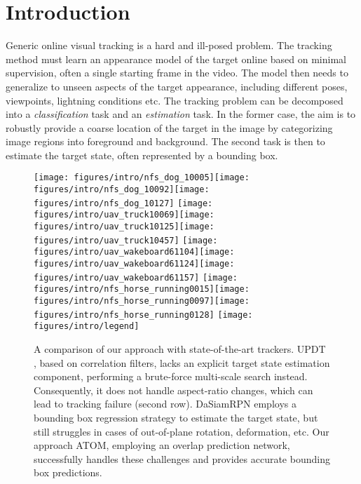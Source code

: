 \documentclass[10pt,twocolumn,letterpaper]{article}
\begin{document}
\section{Introduction}

Generic online visual tracking is a hard and ill-posed problem. The tracking method must learn an appearance model of the target  online based on minimal supervision, often a single starting frame in the video. The model then needs to generalize to unseen aspects of the target appearance, including different poses, viewpoints, lightning conditions etc. The tracking problem can be decomposed into a \emph{classification} task and an \emph{estimation} task. In the former case, the aim is to robustly provide a coarse location of the target in the image by categorizing image regions into foreground and background. The second task is then to estimate the target state, often represented by a bounding box.



\begin{figure}[!t]
	\centering \newcommand{\wid}{0.33\columnwidth}\texttt{[image: figures/intro/nfs\_dog\_10005]}\texttt{[image: figures/intro/nfs\_dog\_10092]}\texttt{[image: figures/intro/nfs\_dog\_10127]}
	\texttt{[image: figures/intro/uav\_truck10069]}\texttt{[image: figures/intro/uav\_truck10125]}\texttt{[image: figures/intro/uav\_truck10457]}
	\texttt{[image: figures/intro/uav\_wakeboard61104]}\texttt{[image: figures/intro/uav\_wakeboard61124]}\texttt{[image: figures/intro/uav\_wakeboard61157]}
	\texttt{[image: figures/intro/nfs\_horse\_running0015]}\texttt{[image: figures/intro/nfs\_horse\_running0097]}\texttt{[image: figures/intro/nfs\_horse\_running0128]}\vspace{-0.5mm}
	\texttt{[image: figures/intro/legend]}\vspace{-1mm}\caption{A comparison of our approach with state-of-the-art trackers. UPDT \cite{BhatECCV2018}, based on correlation filters, lacks an explicit target state estimation component, performing a brute-force multi-scale search instead. Consequently, it does not handle aspect-ratio changes, which can lead to tracking failure (second row). DaSiamRPN \cite{DaSiamRPN} employs a bounding box regression strategy to estimate the target state, but still struggles in cases of out-of-plane rotation, deformation, etc. Our approach ATOM, employing an overlap prediction network, successfully handles these challenges and provides accurate bounding box predictions.
	}\vspace{-2.5mm}\label{fig:intro}\end{figure}
\end{document}

